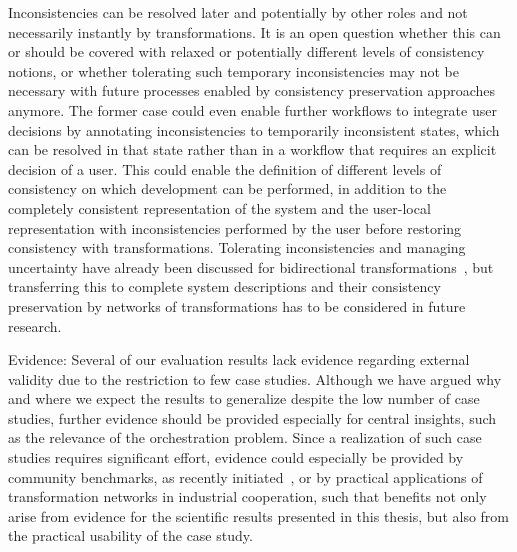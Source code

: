 \begin{properdescription}
Inconsistencies can be resolved later and potentially by other roles and not necessarily instantly by transformations.
It is an open question whether this can or should be covered with relaxed or potentially different levels of consistency notions, or whether tolerating such temporary inconsistencies may not be necessary with future processes enabled by consistency preservation approaches anymore.
The former case could even enable further workflows to integrate user decisions by annotating inconsistencies to temporarily inconsistent states, which can be resolved in that state rather than in a workflow that requires an explicit decision of a user.
This could enable the definition of different levels of consistency on which development can be performed, in addition to the completely consistent representation of the system and the user-local representation with inconsistencies performed by the user before restoring consistency with transformations.
Tolerating inconsistencies and managing uncertainty have already been discussed for bidirectional transformations~\cite{eramo2015uncertainty-SLE,stevens2014Partial-FASE,diskin2016UncertaintyBidirectionalTransformations-BX}, but transferring this to complete system descriptions and their consistency preservation by networks of transformations has to be considered in future research.
\item[Evidence:]
Several of our evaluation results lack evidence regarding external validity due to the restriction to few case studies.
Although we have argued why and where we expect the results to generalize despite the low number of case studies, further evidence should be provided especially for central insights, such as the relevance of the orchestration problem.
Since a realization of such case studies requires significant effort, evidence could especially be provided by community benchmarks, as recently initiated~\cite{anjorin2019bxBenchmark-SoSym}, or by practical applications of transformation networks in industrial cooperation, such that benefits not only arise from evidence for the scientific results presented in this thesis, but also from the practical usability of the case study.
\end{properdescription}



